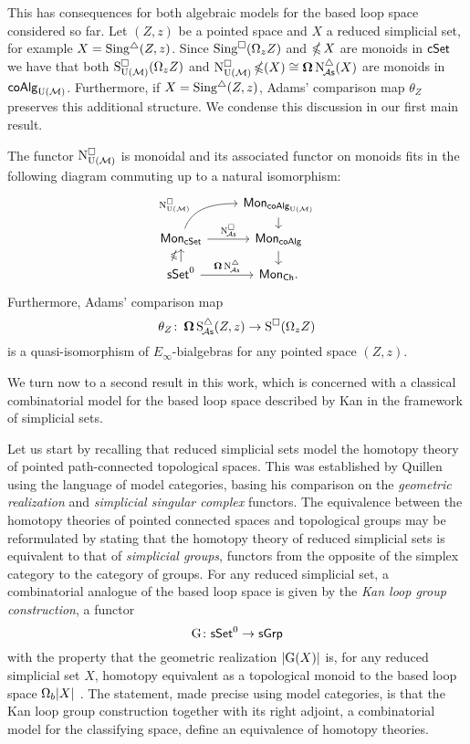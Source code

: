 This has consequences for both algebraic models for the based loop space considered so far.
Let $(Z,z)$ be a pointed space and $X$ a reduced simplicial set, for example $X = \operatorname{Sing^{\triangle}}(Z,z)$.
Since $\operatorname{Sing^{\square}}(\Omega_z Z)$ and $\operatorname{\mathbb{\Omega}} X$ are monoids in $\mathsf{cSet}$ we have that both $\operatorname{S^{\square}_{{\operatorname{U}(\mathcal{M})}}}(\Omega_z Z)$ and $\operatorname{N^{\square}_{{\operatorname{U}(\mathcal{M})}}} \operatorname{\mathbb{\Omega}}(X) \cong \operatorname{\mathbf{\Omega}} \operatorname{N^{\triangle}_{\!{\mathcal{A}\mathsf{s}}}}(X)$ are monoids in $\mathsf{coAlg}_{\operatorname{U}(\mathcal{M})}$.
Furthermore, if $X = \operatorname{Sing^{\triangle}}(Z,z)$, Adams' comparison map $\theta_Z$ preserves this additional structure.
We condense this discussion in our first main result.

\begin{theorem} \label{t:1st main thm in the intro}
	The functor $\operatorname{N^{\square}_{{\operatorname{U}(\mathcal{M})}}}$ is monoidal and its associated functor on monoids fits in the following diagram commuting up to a natural isomorphism:
	\[
	\begin{tikzcd} [row sep=small]
	& \Mon_{\coAlg_\UM} \arrow[d] \\
	\Mon_{\cSet} \arrow[ru, "\cchainsUM", out=70, in=180, near start] \arrow[r, "\cchainsA"]
	& \Mon_{\coAlg} \arrow[d] \\
	\sSet^0 \arrow[r, "\cobar \schainsA"] \arrow[u, "\ccobar"]
	& \Mon_{\Ch}.
	\end{tikzcd}
	\]
Furthermore, Adams' comparison map
\[
\theta_Z \colon \operatorname{\mathbf{\Omega}} \operatorname{S^{\triangle}_{\!{\mathcal{A}\mathsf{s}}}}(Z,z) \to \operatorname{S^{\square}}(\Omega_z Z)
\]
is a quasi-isomorphism of $E_{\infty}$-bialgebras for any pointed space $(Z,z)$.
\end{theorem}

We turn now to a second result in this work, which is concerned with a classical combinatorial model for the based loop space described by Kan in the framework of simplicial sets.

Let us start by recalling that reduced simplicial sets model the homotopy theory of pointed path-connected topological spaces.
This was established by Quillen using the language of model categories, basing his comparison on the \textit{geometric realization} and \textit{simplicial singular complex} functors.
The equivalence between the homotopy theories of pointed connected spaces and topological groups may be reformulated by stating that the homotopy theory of reduced simplicial sets is equivalent to that of \textit{simplicial groups}, functors from the opposite of the simplex category to the category of groups.
For any reduced simplicial set, a combinatorial analogue of the based loop space is given by the \textit{Kan loop group construction}, a functor
\[
\operatorname{G} \colon \mathsf{sSet}^0 \to \mathsf{sGrp}
\]
with the property that the geometric realization $\lvert\operatorname{G}(X)\rvert$ is, for any reduced simplicial set $X$, homotopy equivalent as a topological monoid to the based loop space $\Omega_b \lvert X\rvert$ \cite{berger1995loops}.
The statement, made precise using model categories, is that the Kan loop group construction together with its right adjoint, a combinatorial model for the classifying space, define an equivalence of homotopy theories.

